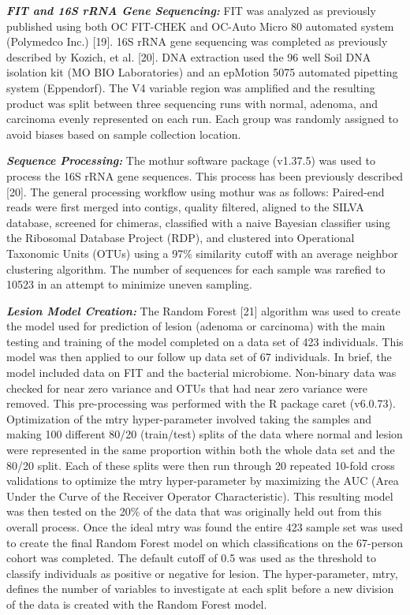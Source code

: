 \documentclass[12pt,]{article}
\begin{document}
\textbf{\emph{FIT and 16S rRNA Gene Sequencing:}} FIT was analyzed as
previously published using both OC FIT-CHEK and OC-Auto Micro 80
automated system (Polymedco Inc.) {[}19{]}. 16S rRNA gene sequencing was
completed as previously described by Kozich, et al. {[}20{]}. DNA
extraction used the 96 well Soil DNA isolation kit (MO BIO Laboratories)
and an epMotion 5075 automated pipetting system (Eppendorf). The V4
variable region was amplified and the resulting product was split
between three sequencing runs with normal, adenoma, and carcinoma evenly
represented on each run. Each group was randomly assigned to avoid
biases based on sample collection location.

\textbf{\emph{Sequence Processing:}} The mothur software package
(v1.37.5) was used to process the 16S rRNA gene sequences. This process
has been previously described {[}20{]}. The general processing workflow
using mothur was as follows: Paired-end reads were first merged into
contigs, quality filtered, aligned to the SILVA database, screened for
chimeras, classified with a naive Bayesian classifier using the
Ribosomal Database Project (RDP), and clustered into Operational
Taxonomic Units (OTUs) using a 97\% similarity cutoff with an average
neighbor clustering algorithm. The number of sequences for each sample
was rarefied to 10523 in an attempt to minimize uneven sampling.

\textbf{\emph{Lesion Model Creation:}} The Random Forest {[}21{]}
algorithm was used to create the model used for prediction of lesion
(adenoma or carcinoma) with the main testing and training of the model
completed on a data set of 423 individuals. This model was then applied
to our follow up data set of 67 individuals. In brief, the model
included data on FIT and the bacterial microbiome. Non-binary data was
checked for near zero variance and OTUs that had near zero variance were
removed. This pre-processing was performed with the R package caret
(v6.0.73). Optimization of the mtry hyper-parameter involved taking the
samples and making 100 different 80/20 (train/test) splits of the data
where normal and lesion were represented in the same proportion within
both the whole data set and the 80/20 split. Each of these splits were
then run through 20 repeated 10-fold cross validations to optimize the
mtry hyper-parameter by maximizing the AUC (Area Under the Curve of the
Receiver Operator Characteristic). This resulting model was then tested
on the 20\% of the data that was originally held out from this overall
process. Once the ideal mtry was found the entire 423 sample set was
used to create the final Random Forest model on which classifications on
the 67-person cohort was completed. The default cutoff of 0.5 was used
as the threshold to classify individuals as positive or negative for
lesion. The hyper-parameter, mtry, defines the number of variables to
investigate at each split before a new division of the data is created
with the Random Forest model.
\end{document}
